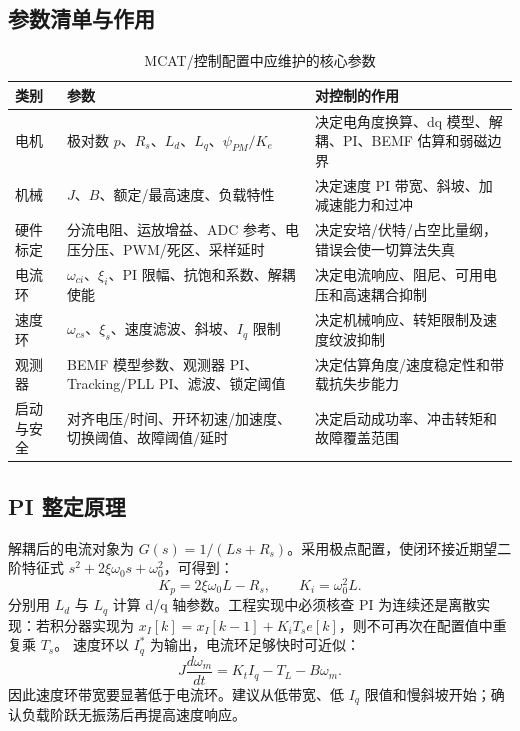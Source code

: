 \documentclass[UTF8,a4paper,11pt,fontset=windows]{ctexart}
\begin{document}
\subsection{参数清单与作用}
\begin{table}[htbp]
\centering
\caption{MCAT/控制配置中应维护的核心参数}
\begin{tabularx}{\textwidth}{p{}p{}Y}
\toprule
类别 & 参数 & 对控制的作用 \\
\midrule
电机 & 极对数 $p$、$R_s$、$L_d$、$L_q$、$\psi_{PM}/K_e$ & 决定电角度换算、dq 模型、解耦、PI、BEMF 估算和弱磁边界 \\
机械 & $J$、$B$、额定/最高速度、负载特性 & 决定速度 PI 带宽、斜坡、加减速能力和过冲 \\
硬件标定 & 分流电阻、运放增益、ADC 参考、电压分压、PWM/死区、采样延时 & 决定安培/伏特/占空比量纲，错误会使一切算法失真 \\
电流环 & $\omega_{ci}$、$\xi_i$、PI 限幅、抗饱和系数、解耦使能 & 决定电流响应、阻尼、可用电压和高速耦合抑制 \\
速度环 & $\omega_{cs}$、$\xi_s$、速度滤波、斜坡、$I_q$ 限制 & 决定机械响应、转矩限制及速度纹波抑制 \\
观测器 & BEMF 模型参数、观测器 PI、Tracking/PLL PI、滤波、锁定阈值 & 决定估算角度/速度稳定性和带载抗失步能力 \\
启动与安全 & 对齐电压/时间、开环初速/加速度、切换阈值、故障阈值/延时 & 决定启动成功率、冲击转矩和故障覆盖范围 \\
\bottomrule
\end{tabularx}
\end{table}
\subsection{PI 整定原理}
解耦后的电流对象为 $G(s)=1/(Ls+R_s)$。采用极点配置，使闭环接近期望二阶特征式 $s^2+2\xi\omega_0s+\omega_0^2$，可得到：
\[
K_p=2\xi\omega_0L-R_s,\qquad K_i=\omega_0^2L.
\]
分别用 $L_d$ 与 $L_q$ 计算 d/q 轴参数。工程实现中必须核查 PI 为连续还是离散实现：若积分器实现为 $x_I[k]=x_I[k-1]+K_iT_s e[k]$，则不可再次在配置值中重复乘 $T_s$。
速度环以 $I_q^*$ 为输出，电流环足够快时可近似：
\[
J\frac{d\omega_m}{dt}=K_t I_q-T_L-B\omega_m.
\]
因此速度环带宽要显著低于电流环。建议从低带宽、低 $I_q$ 限值和慢斜坡开始；确认负载阶跃无振荡后再提高速度响应。
\end{document}
